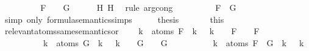 \begin{isabellebody}
\ \ \isamarkupfalse%
\ \isamarkupfalse%
\ {\isachardoublequoteopen}{\isasymdots}\ {\isacharequal}\ {\isacharparenleft}{\isasymA}\ {\isasymTurnstile}\ F\ {\isasymand}\ {\isasymA}\ {\isasymTurnstile}\ G{\isacharparenright}{\isachardoublequoteclose}\isanewline
\ \ \ \ \isamarkupfalse%
\ H{}\ H{}\ \isamarkupfalse%
\ {\isacharparenleft}rule\ arg{\isacharunderscore}cong{}{\isacharparenright}\isanewline
\ \ \isamarkupfalse%
\ \isamarkupfalse%
\ {\isachardoublequoteopen}{\isasymdots}\ {\isacharequal}\ {\isasymA}\ {\isasymTurnstile}\ F\ \isactrlbold {\isasymand}\ G{\isachardoublequoteclose}\isanewline
\ \ \ \ \isamarkupfalse%
\ {\isacharparenleft}simp\ only{\isacharcolon}\ formula{\isacharunderscore}semantics{\isachardot}simps{\isacharparenleft}{}{\isacharparenright}{\isacharparenright}\isanewline
\ \ \isamarkupfalse%
\ \isamarkupfalse%
\ {\isacharquery}thesis\ \isanewline
\ \ \ \ \isamarkupfalse%
\ this\isanewline
{}\isamarkupfalse%
%
\endisatagproof
{\isafoldproof}%
%
\isadelimproof
\isanewline
%
\endisadelimproof
\isanewline
{}\isamarkupfalse%
\ relevant{\isacharunderscore}atoms{\isacharunderscore}same{\isacharunderscore}semantics{\isacharunderscore}or{\isacharcolon}\ \isanewline
\ \ \ {\isachardoublequoteopen}{\isasymforall}k\ {\isasymin}\ atoms\ F{\isachardot}\ {\isasymA}\ k\ {\isacharequal}\ {\isasymA}\ k\ {\isasymLongrightarrow}\ {\isasymA}\ {\isasymTurnstile}\ F\ {\isasymlongleftrightarrow}\ {\isasymA}\ {\isasymTurnstile}\ F{\isachardoublequoteclose}\isanewline
\ \ \ \ \ \ \ \ \ \ {\isachardoublequoteopen}{\isasymforall}k\ {\isasymin}\ atoms\ G{\isachardot}\ {\isasymA}\ k\ {\isacharequal}\ {\isasymA}\ k\ {\isasymLongrightarrow}\ {\isasymA}\ {\isasymTurnstile}\ G\ {\isasymlongleftrightarrow}\ {\isasymA}\ {\isasymTurnstile}\ G{\isachardoublequoteclose}\isanewline
\ \ \ \ \ \ \ \ \ \ {\isachardoublequoteopen}{\isasymforall}k\ {\isasymin}\ atoms\ {\isacharparenleft}F\ \isactrlbold {\isasymor}\ G{\isacharparenright}{\isachardot}\ {\isasymA}\ k\ {\isacharequal}\ {\isasymA}\ k{\isachardoublequoteclose}\isanewline

\end{isabellebody}
